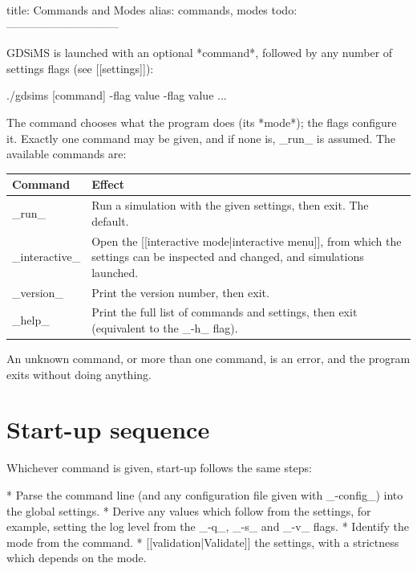 title: Commands and Modes
alias: commands, modes
todo:
------------------------------

GDSiMS is launched with an optional *command*, followed by any number of settings flags (see [[settings]]):

\begin{Code}
	./gdsims [command] -flag value -flag value ...
\end{Code}

The command chooses what the program does (its *mode*); the flags configure it. Exactly one command may be given, and if none is, _run_ is assumed. The available commands are:

\begin{center}
	\begin{tabular}{l p{12cm}}
		\bf Command   & \bf Effect                                                                                                                      \\
		\hline
		_run_         & Run a simulation with the given settings, then exit. The default.                                                               \\
		_interactive_ & Open the [[interactive mode|interactive menu]], from which the settings can be inspected and changed, and simulations launched. \\
		_version_     & Print the version number, then exit.                                                                                            \\
		_help_        & Print the full list of commands and settings, then exit (equivalent to the _-h_ flag).
	\end{tabular}
\end{center}

An unknown command, or more than one command, is an error, and the program exits without doing anything.

\section{Start-up sequence}

	Whichever command is given, start-up follows the same steps:

	* Parse the command line (and any configuration file given with _-config_) into the global settings.
	* Derive any values which follow from the settings, for example, setting the log level from the _-q_, _-s_ and _-v_ flags.
	* Identify the mode from the command.
		* [[validation|Validate]] the settings, with a strictness which depends on the mode.

